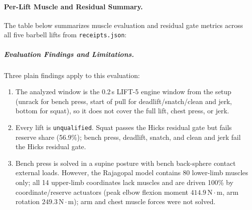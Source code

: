 \documentclass[11pt,a4paper]{article}
\begin{document}
\paragraph{Per-Lift Muscle and Residual Summary.}
The table below summarizes muscle evaluation and residual gate metrics across all five barbell lifts from \texttt{receipts.json}:
\begin{center}\footnotesize\setlength{\tabcolsep}{3pt}
\end{center}

\subparagraph{Evaluation Findings and Limitations.}
Three plain findings apply to this evaluation:
\begin{enumerate}
\item The analyzed window is the 0.2\,s LIFT-5 engine window from the setup (unrack for bench press, start of pull for deadlift/snatch/clean and jerk, bottom for squat), so it does not cover the full lift, chest press, or jerk.
\item Every lift is \texttt{unqualified}. Squat passes the Hicks residual gate but fails reserve share (56.9\%); bench press, deadlift, snatch, and clean and jerk fail the Hicks residual gate.
\item Bench press is solved in a supine posture with bench back-sphere contact external loads. However, the Rajagopal model contains 80 lower-limb muscles only; all 14 upper-limb coordinates lack muscles and are driven 100\% by coordinate/reserve actuators (peak elbow flexion moment $414.9\,\mathrm{N\cdot m}$, arm rotation $249.3\,\mathrm{N\cdot m}$); arm and chest muscle forces were not solved.
\end{enumerate}
\end{document}
